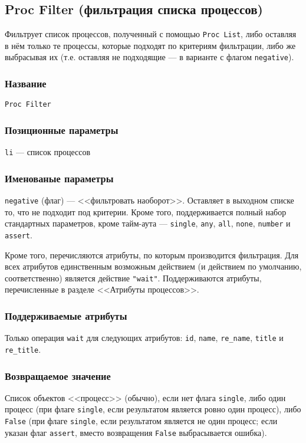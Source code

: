 \documentclass[11pt]{book} %
\begin{document}
\subsection{Proc Filter (фильтрация списка процессов)}
Фильтрует список процессов, полученный с помощью \verb"Proc List", либо оставляя в нём только те процессы, которые подходят по критериям фильтрации, либо же выбрасывая их (т.е. оставляя не подходящие --- в варианте с флагом \verb"negative").



\subsubsection*{Название} 
\verb"Proc Filter"

\subsubsection*{Позиционные параметры} 

\verb"li" --- список процессов

\subsubsection*{Именованые параметры} 


\verb"negative" (флаг) --- <<фильтровать наоборот>>. Оставляет в выходном списке то, что не подходит под критерии. Кроме того, поддерживается полный набор стандартных параметров, кроме тайм-аута --- \verb"single", \verb|any|, \verb|all|, \verb|none|, \verb|number| и \verb"assert".

Кроме того, перечисляются атрибуты, по которым производится фильтрация. Для всех атрибутов единственным возможным действием (и действием по умолчанию, соответственно) является действие \verb|"wait"|. Поддерживаются атрибуты, перечисленные в разделе <<Атрибуты процессов>>.

\subsubsection*{Поддерживаемые атрибуты} 

Только операция \verb|wait| для следующих атрибутов: \verb"id", \verb"name", \verb"re_name", \verb"title" и \verb"re_title".



\subsubsection*{Возвращаемое значение} 
Список объектов <<процесс>> (обычно), если нет флага \verb"single", либо один процесс (при флаге \verb"single", если результатом является ровно один процесс), либо \verb"False" (при флаге \verb"single", если результатом является не один процесс; если указан флаг \verb"assert", вместо возвращения \verb"False" выбрасывается ошибка).
\end{document}

